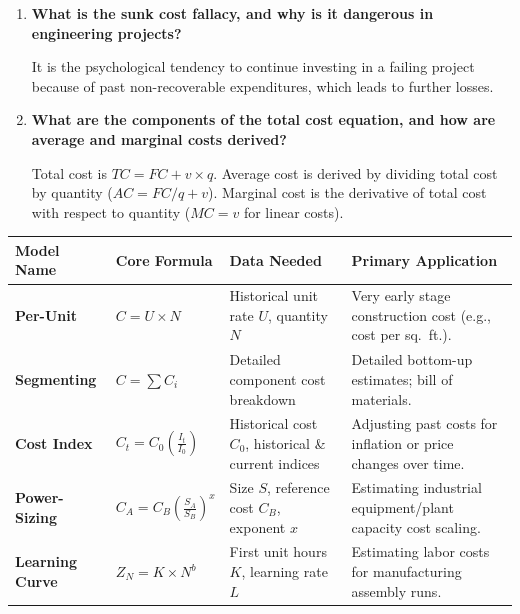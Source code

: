 \documentclass[12pt,a4paper]{article}
\newcommand{\Q}[1]{\textbf{#1}\par\noindent\ignorespaces}
\renewcommand{\arraystretch}{1.45}
\begin{document}
\begin{tcolorbox}[exambox, title={\textbf{Frequently Asked / Viva Questions}}]
\begin{enumerate}[topsep=0pt, label=\textbf{Q\arabic*.}, itemsep=5pt]
  \item \Q{What is the sunk cost fallacy, and why is it dangerous in engineering projects?}
    It is the psychological tendency to continue investing in a failing project because of past non-recoverable expenditures, which leads to further losses.
  \item \Q{What are the components of the total cost equation, and how are average and marginal costs derived?}
    Total cost is $TC = FC + v \times q$. Average cost is derived by dividing total cost by quantity ($AC = FC/q + v$). Marginal cost is the derivative of total cost with respect to quantity ($MC = v$ for linear costs).
\end{enumerate}
\end{tcolorbox}

\begin{tcolorbox}[tikzbox, title={Comparison of Cost Estimating Models}]
\renewcommand{\arraystretch}{1.4}
\par\noindent
\begin{tabularx}{\linewidth}{|B{2.3cm}|Y|Y|Y|}
\hline
\textbf{Model Name} & \textbf{Core Formula} & \textbf{Data Needed} & \textbf{Primary Application} \\
\hline
\textbf{Per-Unit} & $C = U \times N$ & Historical unit rate $U$, quantity $N$ & Very early stage construction cost (e.g., cost per sq.\ ft.). \\
\hline
\textbf{Segmenting} & $C = \sum C_i$ & Detailed component cost breakdown & Detailed bottom-up estimates; bill of materials. \\
\hline
\textbf{Cost Index} & $C_t = C_0 \left( \frac{I_t}{I_0} \right)$ & Historical cost $C_0$, historical \& current indices & Adjusting past costs for inflation or price changes over time. \\
\hline
\textbf{Power-Sizing} & $C_A = C_B \left( \frac{S_A}{S_B} \right)^x$ & Size $S$, reference cost $C_B$, exponent $x$ & Estimating industrial equipment/plant capacity cost scaling. \\
\hline
\textbf{Learning Curve} & $Z_N = K \times N^b$ & First unit hours $K$, learning rate $L$ & Estimating labor costs for manufacturing assembly runs. \\
\hline
\end{tabularx}
\end{tcolorbox}
\end{document}

